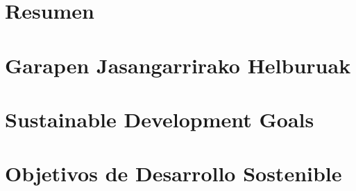 \documentclass[a4paper, 11pt, oneside]{memoir}
\title{\izenburua}
\author{\egilea}
\date{\data}
\begin{document}
 
	
%
 
 
 
%

%
%
 
\cleardoublepage
\frontmatter
{}
\pagestyle{plain}
\setcounter{page}{1}
 
 
 
 
\chapter*{Resumen}

\cleardoublepage
 
\ifdefined\euskaraz
\chapter*{Garapen Jasangarrirako Helburuak} \label{ch:GJH}

\else\ifdefined\english
\chapter*{Sustainable Development Goals} \label{ch:SDG}

\else
\chapter*{Objetivos de Desarrollo Sostenible} \label{ch:ODS}

\fi\fi
 
\end{document}
